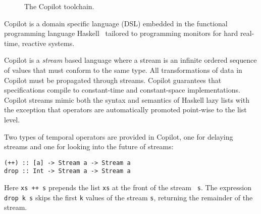 \begin{figure}[ht!]
{
}
        \caption{The Copilot toolchain.}
        \label{fig:toolchain}
        \end{figure}

Copilot is a domain specific language (DSL)  embedded in the functional
programming language Haskell~\cite{Haskell98}   tailored to
programming monitors for hard real-time, reactive systems.

Copilot is a \emph{stream} based language where a stream is an infinite ordered
sequence of values that must conform to the same type.  All transformations of
data in Copilot must be propagated through streams. Copilot
guarantees that specifications compile to constant-time and constant-space
implementations. Copilot streams mimic both the syntax and semantics of
Haskell lazy lists with the exception that  operators are
automatically promoted point-wise to the list level.

Two types of temporal operators are provided in Copilot, one for
delaying streams and one for looking into the future of streams:
\begin{lstlisting}[frame=single]
(++) :: [a] -> Stream a -> Stream a
drop :: Int -> Stream a -> Stream a
\end{lstlisting}
%
Here {\tt xs ++ s} prepends the list {\tt xs} at the front of the stream {\tt
  s}.  The expression {\tt drop k s} skips the first {\tt k} values of the
stream {\tt s}, returning the remainder of the stream.



